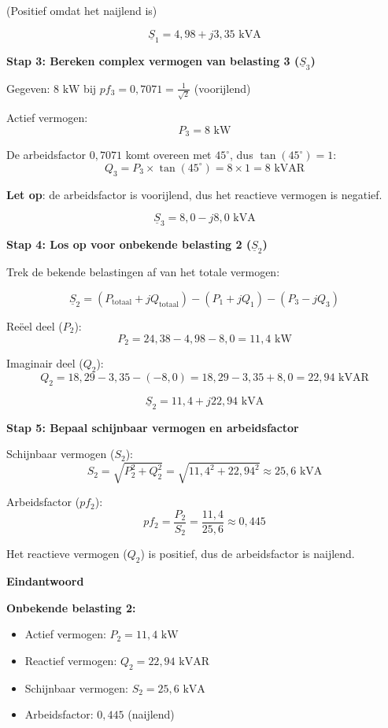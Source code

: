 \documentclass[a4paper,11pt]{article}
\begin{document}
\begin{oefenblok}
    (Positief omdat het naijlend is)

    \[\underline{S}_1 = 4{,}98 + j3{,}35 \text{ kVA}\]

    \textbf{Stap 3: Bereken complex vermogen van belasting 3 ($\underline{S}_3$)}

    Gegeven: $8 \text{ kW}$ bij $pf_3 = 0{,}7071 = \frac{1}{\sqrt{2}}$ (voorijlend)

    Actief vermogen:
    \[P_3 = 8 \text{ kW}\]

    De arbeidsfactor $0{,}7071$ komt overeen met $45^\circ$, dus $\tan(45^\circ) = 1$:
    \[Q_3 = P_3 \times \tan(45^\circ) = 8 \times 1 = 8 \text{ kVAR}\]

    \textbf{Let op}: de arbeidsfactor is voorijlend, dus het reactieve vermogen is negatief.

    \[\underline{S}_3 = 8{,}0 - j8{,}0 \text{ kVA}\]

    \textbf{Stap 4: Los op voor onbekende belasting 2 ($\underline{S}_2$)}

    Trek de bekende belastingen af van het totale vermogen:

    \[\underline{S}_2 = (P_{\text{totaal}} + jQ_{\text{totaal}}) - (P_1 + jQ_1) - (P_3 - jQ_3)\]

    Reëel deel ($P_2$):
    \[P_2 = 24{,}38 - 4{,}98 - 8{,}0 = 11{,}4 \text{ kW}\]

    Imaginair deel ($Q_2$):
    \[Q_2 = 18{,}29 - 3{,}35 - (-8{,}0) = 18{,}29 - 3{,}35 + 8{,}0 = 22{,}94 \text{ kVAR}\]

    \[\underline{S}_2 = 11{,}4 + j22{,}94 \text{ kVA}\]

    \textbf{Stap 5: Bepaal schijnbaar vermogen en arbeidsfactor}

    Schijnbaar vermogen ($S_2$):
    \[S_2 = \sqrt{P_2^2 + Q_2^2} = \sqrt{11{,}4^2 + 22{,}94^2} \approx 25{,}6 \text{ kVA}\]

    Arbeidsfactor ($pf_2$):
    \[pf_2 = \frac{P_2}{S_2} = \frac{11{,}4}{25{,}6} \approx 0{,}445\]

    Het reactieve vermogen ($Q_2$) is positief, dus de arbeidsfactor is naijlend.

    \textbf{Eindantwoord}

    \textbf{Onbekende belasting 2:}
    \begin{itemize}
        \item Actief vermogen: $P_2 = 11{,}4 \text{ kW}$
        \item Reactief vermogen: $Q_2 = 22{,}94 \text{ kVAR}$
        \item Schijnbaar vermogen: $S_2 = 25{,}6 \text{ kVA}$
        \item Arbeidsfactor: $0{,}445$ (naijlend)
    \end{itemize}
\end{oefenblok}
\end{document}
